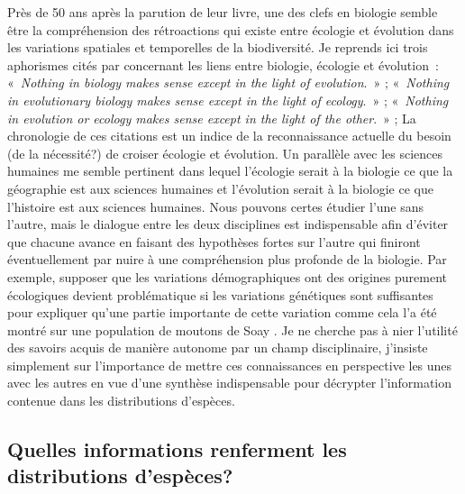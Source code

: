 Près de 50 ans après la parution de leur livre, une des clefs en
biologie semble être la compréhension des rétroactions qui existe entre
écologie et évolution dans les variations spatiales et temporelles de la
biodiversité. Je reprends ici trois aphorismes cités par
\citet{Schoener2011a} concernant les liens entre biologie, écologie et
évolution~: «~\emph{Nothing in biology makes sense except in the light
of evolution}.~» \citep{Dobzhansky1973}; «~\emph{Nothing in evolutionary
biology makes sense except in the light of ecology}.~»
\citep{grant2008}; «~\emph{Nothing in evolution or ecology makes sense
except in the light of the other}.~» \citep{Pelletier2009a}; La
chronologie de ces citations est un indice de la reconnaissance actuelle
du besoin (de la nécessité?) de croiser écologie et évolution. Un
parallèle avec les sciences humaines me semble pertinent dans lequel
l'écologie serait à la biologie ce que la géographie est aux sciences
humaines et l'évolution serait à la biologie ce que l'histoire est aux
sciences humaines. Nous pouvons certes étudier l'une sans l'autre, mais
le dialogue entre les deux disciplines est indispensable afin d'éviter
que chacune avance en faisant des hypothèses fortes sur l'autre qui
finiront éventuellement par nuire à une compréhension plus profonde de
la biologie. Par exemple, supposer que les variations démographiques ont
des origines purement écologiques devient problématique si les
variations génétiques sont suffisantes pour expliquer qu'une partie
importante de cette variation comme cela l'a été montré sur une
population de moutons de Soay \citep{Pelletier2007}. Je ne cherche pas à
nier l'utilité des savoirs acquis de manière autonome par un champ
disciplinaire, j'insiste simplement sur l'importance de mettre ces
connaissances en perspective les unes avec les autres en vue d'une
synthèse indispensable pour décrypter l'information contenue dans les
distributions d'espèces.

\subsection*{Quelles informations renferment les distributions
d'espèces?}\label{quelles-informations-renferment-les-distributions-despuxe8ces}

